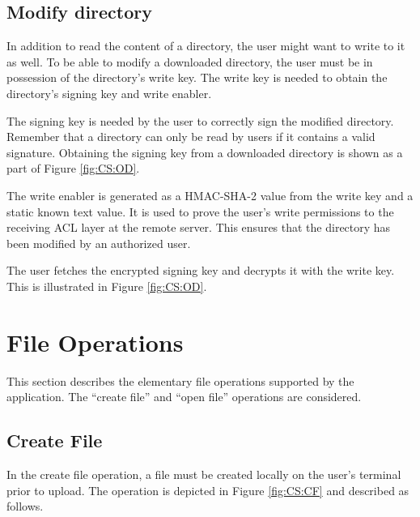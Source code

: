 \documentclass[pdftex,english,10pt,b5paper,twoside]{book}
\begin{document}
\subsection{Modify directory}
In addition to read the content of a directory, the user might want to write to it as well. 
To be able to modify a downloaded directory, the user must be in possession of
the directory's write key. The write key is needed to obtain the directory's
signing key and write enabler. 

The signing key is needed by the user to correctly sign the
modified directory. Remember that a directory can only be read by users if it
contains a valid signature. Obtaining the signing key from a downloaded
directory is shown as a part of Figure \ref{fig:CS:OD}.

The write enabler is generated as a HMAC-SHA-2 value from the write key and a
static known text value. It is used to prove the user's write permissions to the
receiving ACL layer at the remote server. This ensures that the directory has
been modified by an authorized user.

The user fetches the encrypted signing key and decrypts it with the
write key. This is illustrated in Figure \ref{fig:CS:OD}.


\section{File Operations}
This section describes the elementary file operations supported by the 
application. The ``create file'' and ``open file'' operations are considered.

\subsection{Create File}
\label{sec:CS:CF}
In the create file operation, a file must be created locally on the user's terminal
prior to upload. The operation is depicted in Figure \ref{fig:CS:CF} and
described as follows.
\end{document}
